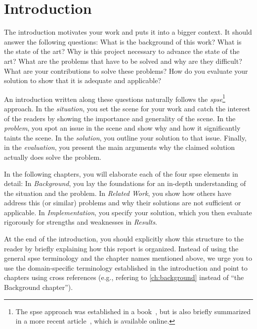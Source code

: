 \chapter{Introduction}
\label{ch:introduction}

The introduction motivates your work and puts it into a bigger context.
It should answer the following questions:
What is the background of this work?
What is the state of the art?
Why is this project necessary to advance the state of the art?
What are the problems that have to be solved and why are they difficult?
What are your contributions to solve these problems?
How do you evaluate your solution to show that it is adequate and applicable?

An introduction written along these questions naturally follows the \textit{\gls{spse}}\footnote{%
  The \acrshort{spse} approach was established in a book~\cite{Hoey83}, but is also briefly summarized in a more recent article~\cite{MP12}, which is available online.
} approach.
In the \emph{situation}, you set the scene for your work and catch the interest of the readers by showing the importance and generality of the scene.
In the \emph{problem}, you spot an issue in the scene and show why and how it significantly taints the scene.
In the \emph{solution}, you outline your solution to that issue.
Finally, in the \emph{evaluation}, you present the main arguments why the claimed solution actually does solve the problem.

In the following chapters, you will elaborate each of the four \gls{spse} elements in detail:
In \textsl{Background}, you lay the foundations for an in-depth understanding of the situation and the problem.
In \textsl{Related Work}, you show how others have address this (or similar) problems and why their solutions are not sufficient or applicable.
In \textsl{Implementation}, you specify your solution, which you then evaluate rigorously for strengths and weaknesses in \textsl{Results}.

At the end of the introduction, you should explicitly show this structure to the reader by briefly explaining how this report is organized.
Instead of using the general \gls{spse} terminology and the chapter names mentioned above, we urge you to use the domain-specific terminology established in the introduction and point to chapters using cross references (e.g., refering to \cref{ch:background} instead of ``the Background chapter'').
